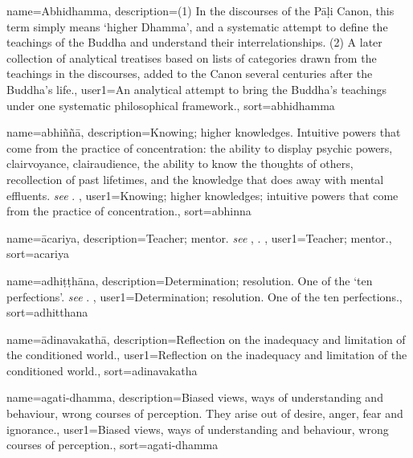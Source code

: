 
\providecommand*\seepre{\textit{see} }
\providecommand*\seepost{.}

{
name={Abhidhamma},
description={(1) In the discourses of the P\=a\d{l}i Canon, this term simply means `higher Dhamma', and a systematic attempt to define the teachings of the Buddha and understand their interrelationships. (2) A later collection of analytical treatises based on lists of categories drawn from the teachings in the discourses, added to the Canon several centuries after the Buddha's life.},
user1={An analytical attempt to bring the Buddha's teachings under one systematic philosophical framework.},
sort={abhidhamma}
}

{
name={abhi\~n\~n\=a},
description={Knowing; higher knowledges. Intuitive powers that come from the practice of concentration: the ability to display psychic powers, clairvoyance, clairaudience, the ability to know the thoughts of others, recollection of past lifetimes, and the knowledge that does away with mental effluents. \protect \seepre %
\protect {}%
\protect \seepost %
},
user1={Knowing; higher knowledges; intuitive powers that come from the practice of concentration.},
sort={abhinna}
}

{
name={\=acariya},
description={Teacher; mentor. \protect \seepre %
\protect {}, \protect {}%
\protect \seepost %
},
user1={Teacher; mentor.},
sort={acariya}
}

{
name={adhi\d{t}\d{t}h\=ana},
description={Determination; resolution. One of the `ten perfections'. \protect \seepre %
\protect {}%
\protect \seepost %
},
user1={Determination; resolution. One of the ten perfections.},
sort={adhitthana}
}

{
name=\=adinavakath\=a,
description={Reflection on the inadequacy and limitation of the conditioned world.},
user1={Reflection on the inadequacy and limitation of the conditioned world.},
sort={adinavakatha}
}

{
name=agati-dhamma,
description={Biased views, ways of understanding and behaviour, wrong courses of perception. They arise out of desire, anger, fear and ignorance.},
user1={Biased views, ways of understanding and behaviour, wrong courses of perception.},
sort={agati-dhamma}
}

